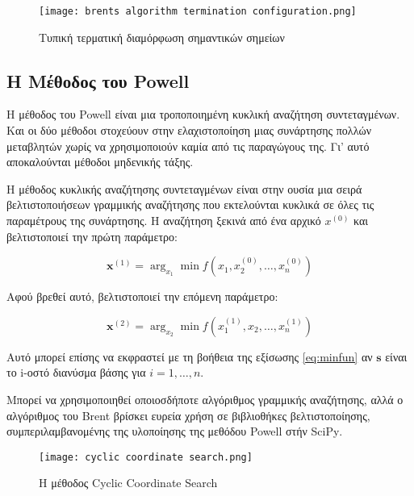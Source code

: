 \begin{figure}[H]
    \centering
    \texttt{[image: brents algorithm termination configuration.png]}
    \caption{Τυπική τερματική διαμόρφωση σημαντικών σημείων \cite{brent1973}}
    \label{fig:typical terminal configuration of important points}

\end{figure}

\subsection{Η Μέθοδος του \textlatin{Powell}}
\label{powells-method}

Η μέθοδος του \textlatin{Powell} είναι μια τροποποιημένη κυκλική αναζήτηση συντεταγμένων. Και οι δύο μέθοδοι στοχεύουν στην ελαχιστοποίηση μιας συνάρτησης πολλών μεταβλητών χωρίς να χρησιμοποιούν καμία από τις παραγώγους της. Γι' αυτό αποκαλούνται μέθοδοι μηδενικής τάξης.

Η μέθοδος κυκλικής αναζήτησης συντεταγμένων είναι στην ουσία μια σειρά βελτιστοποιήσεων γραμμικής αναζήτησης που εκτελούνται κυκλικά σε όλες τις παραμέτρους της συνάρτησης. Η αναζήτηση ξεκινά από ένα αρχικό $x^{(0)}$ και βελτιστοποιεί την πρώτη παράμετρο:

\begin{equation}
\mathbf{x}^{(1)} = \arg_{x_{1}}{\min{f\left( x_{1},x_{2}^{(0)},\ldots,x_{n}^{(0)} \right)}}
\end{equation}

Αφού βρεθεί αυτό, βελτιστοποιεί την επόμενη παράμετρο:

\begin{equation}
\mathbf{x}^{(2)} = \arg_{x_{2}}{\min{f\left( x_{1}^{(1)},x_{2},\ldots,x_{n}^{(1)} \right)}}
\end{equation}

Αυτό μπορεί επίσης να εκφραστεί με τη βοήθεια της εξίσωσης \eqref{eq:minfun} αν $\mathbf{s}$ είναι το \textlatin{i}-οστό διανύσμα βάσης για $i = 1,\ldots,n$.

Μπορεί να χρησιμοποιηθεί οποιοσδήποτε αλγόριθμος γραμμικής αναζήτησης, αλλά ο αλγόριθμος του \textlatin{Brent} βρίσκει ευρεία χρήση σε βιβλιοθήκες βελτιστοποίησης, συμπεριλαμβανομένης της υλοποίησης της μεθόδου \textlatin{Powell} στήν  \textlatin{SciPy}.

\begin{figure}[H]
    \centering
    \texttt{[image: cyclic coordinate search.png]}
    \caption{Η μέθοδος \textlatin{Cyclic Coordinate Search \cite{kochenderfer2019}}}
    \label{fig:CCsearch}
\end{figure}

